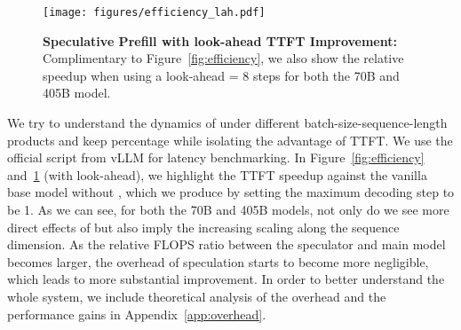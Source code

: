 \begin{figure}[]
\begin{center}
\centerline{\texttt{[image: figures/efficiency\_lah.pdf]}}
\vskip -0.1in
\caption{\textbf{Speculative Prefill with look-ahead TTFT Improvement:} Complimentary to Figure~\ref{fig:efficiency}, we also show the relative speedup when using a look-ahead = 8 steps for both the 70B and 405B model. }
\end{center}
\vskip -0.2in
\label{fig:efficiency_lah}
\end{figure}

We try to understand the dynamics of \ours{} under different batch-size-sequence-length products and keep percentage while isolating the advantage of TTFT. We use the official script from vLLM for latency benchmarking. In Figure~\ref{fig:efficiency} and~\ref{fig:efficiency_lah} (with look-ahead), we highlight the TTFT speedup against the vanilla base model without \ours{}, which we produce by setting the maximum decoding step to be 1. As we can see, for both the 70B and 405B models, not only do we see more direct effects of \ours{} but also imply the increasing scaling along the sequence dimension. As the relative FLOPS ratio between the speculator and main model becomes larger, the overhead of speculation starts to become more negligible, which leads to more substantial improvement. In order to better understand the whole system, we include theoretical analysis of the overhead and the performance gains in Appendix~\ref{app:overhead}. 
